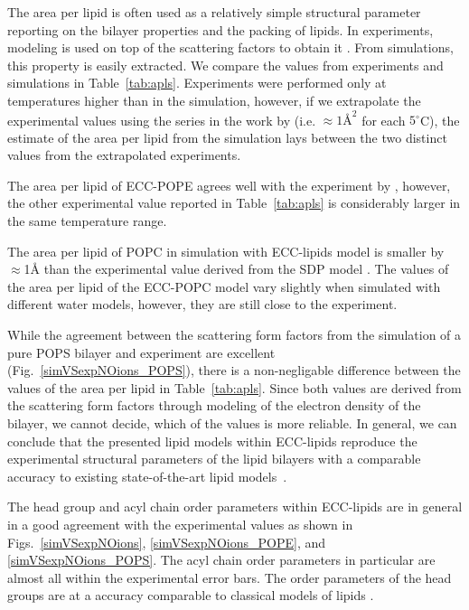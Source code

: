 The area per lipid is often used as a relatively simple structural parameter reporting on the bilayer properties and the packing of lipids. 
In experiments, modeling is used on top of the scattering factors to obtain it \citep{SDP-CHARMM36_comparison_paper_Samuli-knows}. 
From simulations, this property is easily extracted. 
We compare the values from experiments and simulations in Table~\ref{tab:apls}. 
Experiments were performed only at temperatures higher than in the simulation, 
however, if we extrapolate the experimental values using the series in the work by \citet{rappolt03} 
(i.e. $\approx 1Å^2$ for each $5^\circ$C), 
the estimate of the area per lipid from the simulation lays between the two distinct values from the extrapolated experiments. 

The area per lipid of ECC-POPE agrees well with the experiment by \citet{parsegian89}, 
however, the other experimental value reported in Table~\ref{tab:apls} is considerably larger in the same temperature range. 

The area per lipid of POPC in simulation with ECC-lipids model is smaller by $\approx$1Å 
than the experimental value derived from the SDP model \citep{SDP-CHARMM36_comparison_paper_Samuli-knows}. 
The values of the area per lipid of the ECC-POPC model vary slightly 
when simulated with different water models, however,
they are still close to the experiment. 

While the agreement between the scattering form factors 
from the simulation of a pure POPS bilayer and experiment 
are excellent (Fig.~\ref{simVSexpNOions_POPS}),
there is a non-negligable difference between the values of the area per lipid in Table~\ref{tab:apls}. 
Since both values are derived from the scattering form factors through modeling of the electron density of the bilayer,
we cannot decide, which of the values is more reliable. 
In general, we can conclude that the presented lipid models within ECC-lipids 
reproduce the experimental structural parameters of the lipid bilayers 
with a comparable accuracy to existing state-of-the-art lipid models~\citep{ollila16}. 
 
The head group and acyl chain order parameters within ECC-lipids
are in general in a good agreement with the experimental values 
as shown in Figs.~\ref{simVSexpNOions}, \ref{simVSexpNOions_POPE},  and \ref{simVSexpNOions_POPS}. 
The acyl chain order parameters in particular are almost all within the experimental error bars.
The order parameters of the head groups are at a accuracy comparable to classical models of lipids \citep{botan15, catte16, Pluhackova2016}. 


